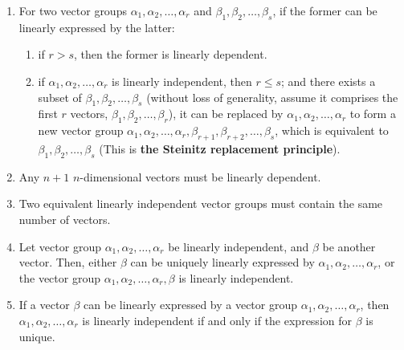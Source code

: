 \documentclass[11pt]{../../TexTemplate/elegantbook} %
\begin{document}
\begin{proposition}
\begin{enumerate}
    \item For two vector groups \( \alpha_1, \alpha_2, \dots, \alpha_r \) and \( \beta_1, \beta_2, \dots, \beta_s \),
        if the former can be linearly expressed by the latter:
        \begin{enumerate}[label=\roman*.]
            \item if \( r > s \), then the former is linearly dependent.
            \item if \( \alpha_1, \alpha_2, \dots, \alpha_r \) is linearly independent, then \( r \leqslant s \);
                and there exists a subset of \( \beta_1, \beta_2, \dots, \beta_s \) (without loss of generality, 
                assume it comprises the first \(r\) vectors, \( \beta_1, \beta_2, \dots, \beta_r \)),
                it can be replaced by \( \alpha_1, \alpha_2, \dots, \alpha_r \) to form a new vector group
                \( \alpha_1, \alpha_2, \dots, \alpha_r, \beta_{r+1}, \beta_{r+2}, \dots, \beta_s \),
                which is equivalent to \( \beta_1, \beta_2, \dots, \beta_s \) (This is \textbf{the Steinitz replacement principle}).
        \end{enumerate}

    \item Any \( n+1 \) \( n \)-dimensional vectors must be linearly dependent.
    
    \item Two equivalent linearly independent vector groups must contain the same number of vectors.

    \item Let vector group \( \alpha_1, \alpha_2, \dots, \alpha_r \) be linearly independent,     
        and \(\beta\) be another vector.
        Then, either \( \beta \) can be uniquely linearly expressed by \( \alpha_1, \alpha_2, \dots, \alpha_r \),
        or the vector group \( \alpha_1, \alpha_2, \dots, \alpha_r, \beta \) is linearly independent.
    \item If a vector \( \beta \) can be linearly expressed by a vector group \( \alpha_1, \alpha_2, \dots, \alpha_r \), 
        then \( \alpha_1, \alpha_2, \dots, \alpha_r \) is linearly independent
        if and only if the expression for \( \beta \) is unique.
\end{enumerate}
\end{proposition}
\end{document}
